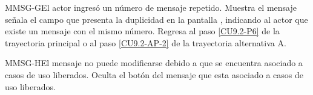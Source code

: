 	\begin{UCtrayectoriaA}{MMSG-G}{El actor ingresó un número de mensaje repetido.}
		\UCpaso[\UCsist] Muestra el mensaje  señala el campo que presenta la duplicidad en la pantalla , indicando al actor que existe un mensaje con el mismo número.
		\UCpaso Regresa al paso \ref{CU9.2-P6} de la trayectoria principal o al paso \ref{CU9.2-AP-2} de la trayectoria alternativa A.
	\end{UCtrayectoriaA}

	\begin{UCtrayectoriaA}{MMSG-H}{El mensaje no puede modificarse debido a que se encuentra asociado a casos de uso liberados.}
		\UCpaso[\UCsist] Oculta el botón \editar del mensaje que esta asociado a casos de uso liberados.
	\end{UCtrayectoriaA}
